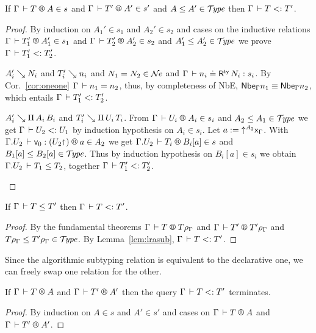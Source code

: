 \documentclass[acmlarge,review,anonymous]{acmart}\settopmatter{printfolios=true}
\begin{document}
\begin{lemma}
\label{lem:lrasub}
\bla
   If\/ $\LRTS \Gamma T A s$ and $\LRTS \Gamma {T'} {A'} {s'}$ and $A \leq A' \in \mathcal{T}\!\mathit{ype}$ then $\Gamma \,\vdash T \mathrel{{<}{:}} T'$.
\end{lemma}
\begin{proof}
By induction on $A_1' \in s_1$ and $A_2' \in s_2$ and cases on the inductive relations
$\LRTS \Gamma {T_1'} {A_1'} {s_1}$ and $\LRTS \Gamma {T_2'} {A_2'} {s_2}$ and $A_1' \leq A_2' \in \mathcal{T}\!\mathit{ype}$
we prove $\Gamma \,\vdash T_1' \mathrel{{<}{:}} T_2'$.

\begin{caselist}

\nextcase $A_i' \searrow N_i$ and $T_i' \searrow n_i$ and $N_1 = N_2 \in \mathcal{N}\!\mathit{e}$ and $\Gamma \,\vdash n_i \doteq \mathsf{R}^{\mathsf{ty}}\, N_i : s_i$.
By Cor.~\ref{cor:oneone} $\Gamma \,\vdash n_1 = n_2$, thus, by completeness of NbE, $\mathsf{Nbe}_{\Gamma} n_1 \equiv \mathsf{Nbe}_{\Gamma} n_2$, which entails $\Gamma \,\vdash T_1' \mathrel{{<}{:}} T_2'$.

\nextcase $A_i' \searrow \Pi\,A_i\, {B_i}$ and  $T_i' \searrow \Pi\,U_i\,{T_i}$.
From $\LRTS \Gamma {U_i} {A_i} {s_i}$ and $A_2 \leq A_1 \in \mathcal{T}\!\mathit{ype}$ we get $\Gamma \,\vdash U_2 \mathrel{{<}{:}} U_1$
by induction hypothesis on $A_i \in s_i$.
Let $a := {\mathord{\uparrow^{A_2}} \mathsf{x}_{\Gamma}}$.  With $\LR {\cext \Gamma {U_2}} {\ind 0} {(U_2\slift)} a {A_2}$ we get
$\LRTS {\cext \Gamma {U_2}} {T_i} {B_i[a]} s$ and $B_1[a] \leq B_2[a] \in \mathcal{T}\!\mathit{ype}$.  Thus by induction hypothesis on $B_i[a] \in s_i$ we obtain $\Gamma. {U_2} \,\vdash T_1 \leq T_2$, together $\Gamma \,\vdash T_1' \mathrel{{<}{:}} T_2'$.

\end{caselist}
\end{proof}

\begin{corollary}
\label{cor:complasub}
If $\Gamma \,\vdash T \leq T'$ then $\Gamma \,\vdash T \mathrel{{<}{:}} T'$.
\end{corollary}
\begin{proof}
  By the fundamental theorems $\RG \Gamma T {T\rhog}$ and $\RG \Gamma {T'} {T'\rhog}$ and $T\rho_\Gamma \leq T'\rho_\Gamma \in \mathcal{T}\!\mathit{ype}$.
  By Lemma~\ref{lem:lrasub}, $\Gamma \,\vdash T \mathrel{{<}{:}} T'$.
\end{proof}

Since the algorithmic subtyping relation is equivalent to the declarative one, we can freely swap one relation for the other.

\begin{lemma}
  \label{lem:termasub}
  If $\RG \Gamma T A$ and $\RG \Gamma {T'} {A'}$ then the query $\Gamma \,\vdash T \mathrel{{<}{:}} T'$ terminates.
\end{lemma}
\begin{proof}
  By induction on $A \in s$ and $A' \in s'$ and cases on $\RG \Gamma T A$ and $\RG \Gamma {T'} {A'}$.
\end{proof}
\end{document}

